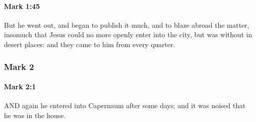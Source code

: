 		\paragraph{Mark 1:45} %
			\label{MARK-1-45}

			But he went out, and began to publish it much, and to blaze abroad the matter, insomuch that Jesus could no more openly enter into the city, but was without in desert places: and they came to him from every quarter.

			\begin{framed}
			\scriptsize
				\begin{compactdesc}
					\item[SBLG] 
				\end{compactdesc}
			\end{framed}

	\subsubsection{Mark 2} %
		\label{MARK-2}
		
		\paragraph{Mark 2:1} %
			\label{MARK-2-1}

			AND again he entered into Capernaum after some days; and it was noised that he was in the house.

